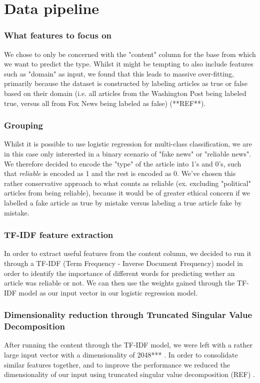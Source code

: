 \section{Data pipeline}
\subsubsection{What features to focus on}
We chose to only be concerned with the "content" column for the base from which we want to predict the type. Whilst it
might be tempting to also include features such as "domain" as input, we found that this leads to massive over-fitting,
primarily because the dataset is constructed by labeling articles as true or false based on their domain (i.e. all
articles from the Washington Post being labeled true, versus all from Fox News being labeled as false) (**REF**).
\subsubsection{Grouping}
Whilst it is possible to use logistic regression for multi-class classification, we are in this case only interested in
a binary scenario of "fake news" or "reliable news". We therefore decided to encode the "type" of the article into 1's
and 0's, such that \textit{reliable} is encoded as 1 and the rest is encoded as 0. We've chosen this rather
conservative approach to what counts as reliable (ex. excluding "political" articles from being reliable), because it
would be of greater ethical concern if we labelled a fake article as true by mistake versus labeling a true article
fake by mistake.

\subsubsection{TF-IDF feature extraction}
In order to extract useful features from the content column, we decided to run it through a TF-IDF (Term
Frequency - Inverse Document Frequency) model in order to identify the importance of different words for predicting
wether an article was reliable or not. We can then use the weights gained through the TF-IDF model as our input vector
in our logistic regression model. 

\subsubsection{Dimensionality reduction through Truncated Singular Value Decomposition}
After running the content through the TF-IDF model, we were left with a rather large input vector with a dimensionality
of 2048***
. In order to consolidate similar features together, and to improve the performance we reduced the
dimensionality of our input using truncated singular value decomposition (REF) .
